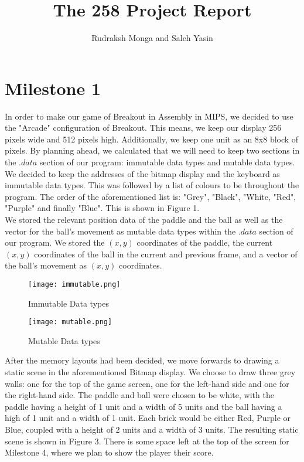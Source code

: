 \documentclass{article}
\title{The 258 Project Report}
\author{Rudraksh Monga and Saleh Yasin}
\begin{document}
\maketitle

\section{Milestone 1}

In order to make our game of Breakout in Assembly in MIPS, we decided to use the "Arcade" configuration of Breakout. This means, we keep our display 256 pixels wide and 512 pixels high. Additionally, we keep one unit as an 8x8 block of pixels. By planning ahead, we calculated that we will need to keep two sections in the $.data$ section of our program: immutable data types and mutable data types. \\

\noindent We decided to keep the addresses of the bitmap display and the keyboard as immutable data types. This was followed by a list of colours to be throughout the program. The order of the aforementioned list is: "Grey", "Black", "White, "Red", "Purple" and finally "Blue". This is shown in Figure 1.\\

\noindent We stored the relevant position data of the paddle and the ball as well as the vector for the ball's movement as mutable data types within the $.data$ section of our program. We stored the $(x,y)$ coordinates of the paddle, the current $(x, y)$ coordinates of the ball in the current and previous frame, and a vector of the ball's movement as $(x, y)$ coordinates. \\

\begin{figure}[ht!]
    \centering
    \texttt{[image: immutable.png]}
    \caption{Immutable Data types}
    \label{f:counter2}
\end{figure}

\begin{figure}[ht!]
    \centering
    \texttt{[image: mutable.png]}
    \caption{Mutable Data types}
    \label{f:counter2}
\end{figure}

\pagebreak

After the memory layouts had been decided, we move forwards to drawing a static scene in the aforementioned Bitmap display. We choose to draw three grey walls: one for the top of the game screen, one for the left-hand side and one for the right-hand side. The paddle and ball were chosen to be white, with the paddle having a height of 1 unit and a width of 5 units and the ball having a high of 1 unit and a width of 1 unit. Each brick would be either Red, Purple or Blue, coupled with a height of 2 units and a width of 3 units. The resulting static scene is shown in Figure 3. There is some space left at the top of the screen for Milestone 4, where we plan to show the player their score.
\end{document}
